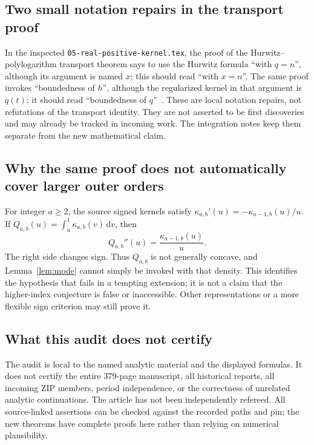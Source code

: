 \documentclass[11pt]{article}
\numberwithin{equation}{section}
\theoremstyle{definition}
\theoremstyle{remark}
\newcommand{\dd}{\,\mathrm d}
\newcommand{\src}[1]{\nolinkurl{#1}}
\begin{document}
\subsection{Two small notation repairs in the transport proof}
In the inspected \src{05-real-positive-kernel.tex}, the proof of the
Hurwitz--polylogarithm transport theorem says to use the Hurwitz formula
``with $q=n$'', although its argument is named $x$; this should read
``with $x=n$''. The same proof invokes ``boundedness of $h$'', although
the regularized kernel in that argument is $q(t)$; it should read
``boundedness of $q$''~\cite{repo-positive}. These are local notation
repairs, not refutations of the transport identity. They are not
asserted to be first discoveries and may already be tracked in
incoming work. The integration notes keep them separate from the
new mathematical claim.

\subsection{Why the same proof does not automatically cover larger outer orders}
For integer $a\ge2$, the source signed kernels satisfy
$\kappa_{a,b}'(u)=-\kappa_{a-1,b}(u)/u$.
If $Q_{a,b}(u)=\int_u^1\kappa_{a,b}(v)\dd v$, then
\begin{equation}\label{eq:highercurvature}
 Q_{a,b}''(u)=\frac{\kappa_{a-1,b}(u)}u.
\end{equation}
The right side changes sign. Thus $Q_{a,b}$ is not generally concave,
and Lemma~\ref{lem:mode} cannot simply be invoked with that density.
This identifies the hypothesis that fails in a tempting extension;
it is not a claim that the higher-index conjecture is false or
inaccessible. Other representations or a more flexible sign criterion
may still prove it.

\subsection{What this audit does not certify}
The audit is local to the named analytic material and the displayed
formulas. It does not certify the entire 379-page manuscript, all
historical reports, all incoming ZIP members, period independence,
or the correctness of unrelated analytic continuations. The article
has not been independently refereed. All source-linked assertions can
be checked against the recorded paths and pin; the new theorems have
complete proofs here rather than relying on numerical plausibility.
\end{document}
